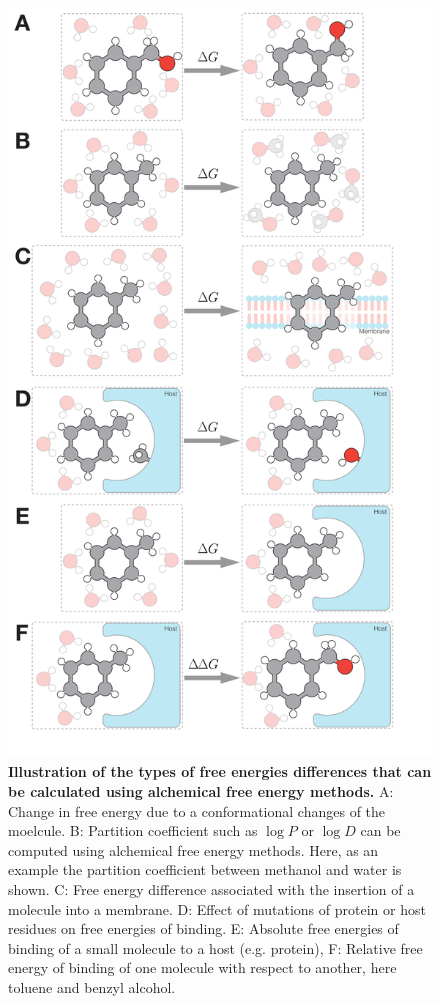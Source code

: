 \documentclass[9pt,bestpractices]{livecoms}
\begin{document}
\begin{figure}
    \includegraphics[width=0.95\linewidth]{figures/fig1_what_is_alchemy/Figure.pdf}   
    \caption{\textbf{Illustration of the types of free energies differences that can be calculated using alchemical free energy methods.} A: Change in free energy due to a conformational changes of the moelcule. B: Partition coefficient such as $\log P$ or $\log D$ can be computed using alchemical free energy methods. Here, as an example the partition coefficient between methanol and water is shown. C: Free energy difference associated with the insertion of a molecule into a membrane. D: Effect of mutations of protein or host residues on free energies of binding.  E: Absolute free energies of binding of a small molecule to a host (e.g. protein), F: Relative free energy of binding of one molecule with respect to another, here toluene and benzyl alcohol.
    \label{fig:fig_what_is_alchemy}
    }
\end{figure}
\end{document}
